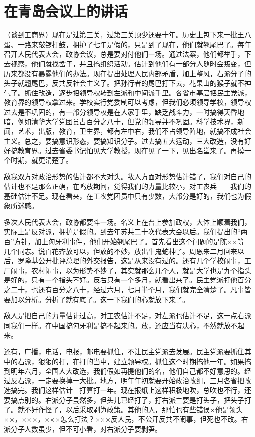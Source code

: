 \section[在青岛会议上的讲话（一九五七年七月十八日）]{在青岛会议上的讲话}


（谈到工商界）现在是过第三关，过第三关顶少还要十年。历史上包下来一批王八蛋、一路来敲锣打鼓，拥护了七年是假的，只是到了现在，他们就翘尾巴了。每年召开人民代表大会，政协会议，总是要对付他们一场。通过法案，他们都举手，下去视察，他们就找岔子，并且搞组织活动。估计到他们有一部分人随时会叛变，但历来都没有暴露他们的办法。现在提出处理人民内部矛盾，加上整风，右派分子的头子就翘尾巴，反共反社会主义了。把孙行者的尾巴打下去，花果山的猴子就不神气了。抓住改造，逐步把领导权转到左派和中间派手里。各省市基层把民主党派，教育界的领导权拿过来。学校实行党委制可以考虑，但我们必须领导学校，领导权过去是不巩固的，有一部分领导权是在人家手里，缺乏战斗力，一时搞得天昏地暗，例如清华大学党团员占百分之八十，但党的领导并不巩固。科学技术界，新闻，艺术，出版，教育，卫生界，都有左中右，我们不占领导阵地，就搞不成社会主义。总之，要搞意识形态，要搞知识分子。过去搞五大运动，三大改造，没有好好搞教育界。过去省委书记怕见大学教授，现在见了一下，见出名堂来了。再摸一个时期，就更清楚了。

敌我双方对政治形势的估计都不大对头。敌人方面对形势估计错了，我们对自己的估计也不是那么正确，在鸣放期间，觉得我们的力量比较小，对工农兵——我们的基础估计不足。现在看来，在工农党团员中只有少数，大部分是好的，我们也为假象所迷惑。

多次人民代表大会，政协都要斗一场。名义上在台上参加政权，大体上顺着我们，实际上是反对派，拥护是假的。到去年苏共二十次代表大会以后。我们提出的“两百”方针，加上匈牙利事件，他们开始翘尾巴了。首先看出这个问题的是陈××等几个同志。说百花齐放可以，但放的不妙，放出牛鬼蛇神了。周恩来二月回来以后，罗隆基公开批评总理的外交报告，这是从来没有过的。还有几个学校闹事，工厂闹事，农村闹事，以为形势不妙了，其实就那么几个人，就是大学也是九个指头是好的，只有一个指头不好。反右只有一个多月，就看出来了。民主党派打他百分之二十，也还有百分之八十，经过六月，七月半个月，我们就完全清楚了。凡事皆要加以分析。分析了就有底了。这一下我们的心就放下来了。

敌人是把自己的力量估计过高，对工农估计不足，对左派也估计不足，这一点右派同我们一样。在中国搞匈牙利是搞不起来的。放，还应当有决心，不然就放不起来。

还有，广播，电话，电报，邮电要抓住，不让民主党派去发展。民主党派要抓住其中的右派，狠狠的打，在打的当中，建立领导权。抓住这个时期搞他一年。如果搞到明年六月，全国人大改选，我们假如再提他们的名，他们自己都不好意思的。经过反右派，一定要换掉一大批。地方，明年年初就要开始政治改组，三月各省把改选搞完。我们这样估计：打算打一年。现在报纸上这样积极地吹，总吹也不行，还要搞点别的。右派分子虽然多，但头儿已经打了，打右派主要是打头子，把头子打了。就不好作怪了，以后采取剥笋政策。其他的人，那怕也有些错误×他是领头××，×××，×××怎么打法？×××反人民，不公开反共不闹事，但死也不改。右派分子人数虽少，但不可小看，对右派分子要剥笋。

